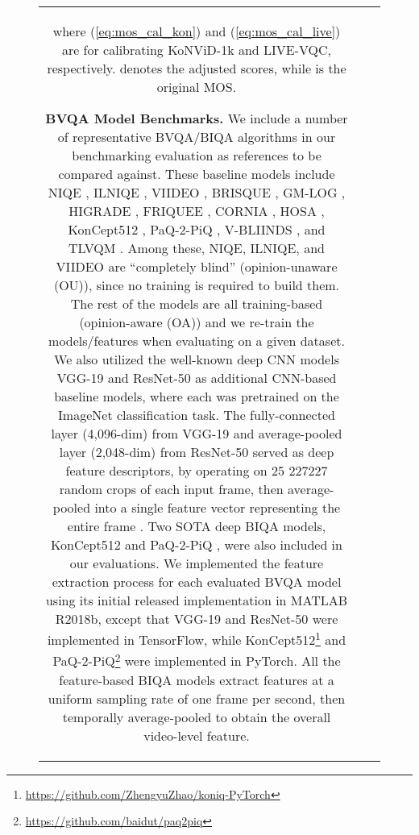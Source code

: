 \documentclass[journal]{IEEEtran}
\begin{document}
\begin{figure}[!t]
\begin{tabular}{ccc}
where (\ref{eq:mos_cal_kon}) and (\ref{eq:mos_cal_live}) are for calibrating KoNViD-1k and LIVE-VQC, respectively.  denotes the adjusted scores, while  is the original MOS.

\textbf{BVQA Model Benchmarks.} We include a number of representative BVQA/BIQA algorithms in our benchmarking evaluation as references to be compared against. These baseline models include NIQE \cite{mittal2012making}, ILNIQE \cite{zhang2015feature}, VIIDEO \cite{mittal2015completely}, BRISQUE \cite{mittal2012no}, GM-LOG \cite{xue2014blind}, HIGRADE \cite{kundu2017no}, FRIQUEE \cite{ghadiyaram2017perceptual}, CORNIA \cite{ye2012unsupervised}, HOSA \cite{xu2016blind}, KonCept512 \cite{hosu2020koniq}, PaQ-2-PiQ \cite{ying2019patches}, V-BLIINDS \cite{saad2014blind}, and TLVQM \cite{korhonen2019two}. Among these, NIQE, ILNIQE, and VIIDEO are ``completely blind'' (opinion-unaware (OU)), since no training is required to build them. The rest of the models are all training-based (opinion-aware (OA)) and we re-train the models/features when evaluating on a given dataset. We also utilized the well-known deep CNN models VGG-19 \cite{simonyan2014very} and ResNet-50 \cite{he2016deep} as additional CNN-based baseline models, where each was pretrained on the ImageNet classification task. The fully-connected layer (4,096-dim) from VGG-19 and average-pooled layer (2,048-dim) from ResNet-50 served as deep feature descriptors, by operating on 25 227227 random crops of each input frame, then average-pooled into a single feature vector representing the entire frame \cite{kim2017deep}. Two SOTA deep BIQA models, KonCept512 \cite{hosu2020koniq} and PaQ-2-PiQ \cite{ying2019patches}, were also included in our evaluations. We implemented the feature extraction process for each evaluated BVQA model using its initial released implementation in MATLAB R2018b, except that VGG-19 and ResNet-50 were implemented in TensorFlow, while KonCept512\footnote{\url{https://github.com/ZhengyuZhao/koniq-PyTorch}} and PaQ-2-PiQ\footnote{\url{https://github.com/baidut/paq2piq}} were implemented in PyTorch. All the feature-based BIQA models extract features at a uniform sampling rate of one frame per second, then temporally average-pooled to obtain the overall video-level feature.


\end{tabular}
\end{figure}
\end{document}

